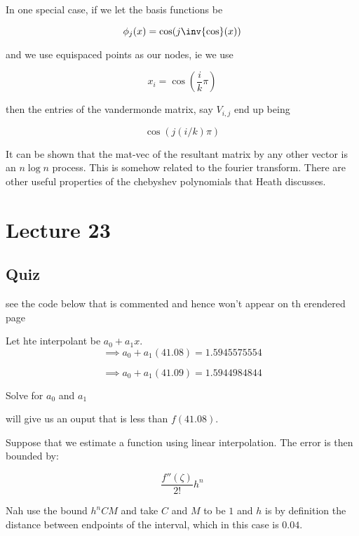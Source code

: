 \documentclass[../main.tex]{subfiles}
\begin{document}
\begin{definition}
    In one special case, if we let the basis functions be

    \[
        \phi_j(x) = \cos(j \inv{\cos}(x))
    \]

    and we use equispaced points as our nodes, ie we use

    \[
        x_i = \cos\left( \frac{i}{k}\pi \right)
    \]

    then the entries of the vandermonde matrix, say $V_{i,j}$ end up being

    \[
        \cos\left( j(i/k)\pi \right)
    \]

    It can be shown that the mat-vec of the resultant matrix by any other vector is an $n \log n$ process. This is somehow related to the fourier transform. There are other useful properties of the chebyshev polynomials that Heath discusses.
\end{definition}

\section{Lecture 23}
\subsection{Quiz}


see the code below that is commented and hence won't appear on th erendered page

Let hte interpolant be $a_0 + a_1 x$.
\[
    \implies a_0 + a_1(41.08) = 1.5945575554
\]

\[
    \implies a_0 + a_1(41.09) = 1.5944984844
\]

Solve for $a_0$ and $a_1$



will give us an ouput that is less than $f(41.08)$.

Suppose that we estimate a function using linear interpolation. The error is then bounded by:

\[
    \frac{f''(\zeta)}{2!}h^n
\]

Nah use the bound $h^n C M$ and take $C$ and $M$ to be $1$ and $h$ is by definition the distance between endpoints of the interval, which in this case is $0.04$.
\end{document}

